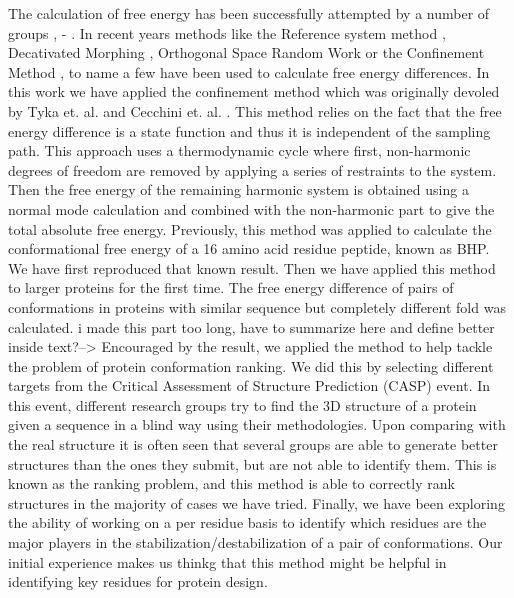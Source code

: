 \documentclass[12pt]{article}
\newcommand{\Alberto}[1]{\color{ForestGreen}#1\normalcolor }
\begin{document}
The calculation of free energy has been successfully attempted by a number of groups \cite{Meirovitch2007}, 
\cite{Ytreberg2006} - \cite{Zheng2008}. In recent years methods like the Reference system method \cite{Ytreberg2006}, 
Decativated Morphing \cite{Park2008}, Orthogonal Space Random Work \cite{Zheng2008} or the Confinement 
Method \cite{Tyka2006}, \cite{Cecchini2009} to name a few have been used to calculate free energy
differences.
In this work we have applied the confinement method which was originally devoled by Tyka et. al. \cite{Tyka2006} and
Cecchini et. al. \cite{Cecchini2009}. This method relies on the fact that the free energy difference is a state function and 
thus it is independent of the sampling path. This approach uses a thermodynamic cycle where first, non-harmonic degrees of
freedom are removed by applying a series of restraints to the system. Then the free energy of the
remaining harmonic system is obtained using a normal mode calculation and combined with the
non-harmonic part to give the total absolute free energy.  Previously, this method was applied to
calculate the conformational free energy of a 16 amino acid residue peptide, known as BHP.  We have
first reproduced that known result. Then we have applied this method to larger proteins for the
first time. The free energy difference of pairs of conformations in proteins with similar sequence but completely
different fold was calculated. \Alberto{i made this part too long, have to summarize here and define
better inside text?-->} Encouraged by the result, we applied the method to help tackle the
problem of protein conformation ranking. We did this by selecting different targets from the
Critical Assessment of Structure Prediction (CASP) event. In this event, different research groups
try to find the 3D structure of a protein given a sequence in a blind way using their methodologies. Upon comparing
with the real structure it is often seen that several groups are able to generate better structures
than the ones they submit, but are not able to identify them. This is known as the ranking problem,
and this method is able to correctly rank structures in the majority of cases we have tried.
 Finally, we have been exploring the ability of working on a per residue basis to identify which
 residues are the major players in the stabilization/destabilization of a pair of conformations. Our
 initial experience makes us thinkg that this method might be helpful in identifying key residues
 for protein design.

\end{document}
